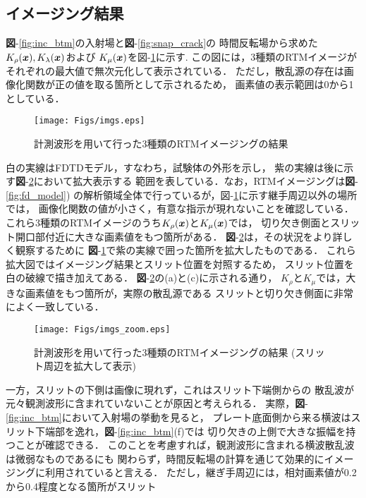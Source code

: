\subsection{イメージング結果}
{\bf 図}-\ref{fig:inc_btm}の入射場と{\bf 図}-\ref{fig:snap_crack}の
時間反転場から求めた$K_\rho(\boldsymbol{x}),K_{\lambda}(\boldsymbol{x})$および
$K_{\mu}(\boldsymbol{x})$を{図-}\ref{fig:imgs}に示す. 
この図には，3種類のRTMイメージがそれぞれの最大値で無次元化して表示されている．
ただし，散乱源の存在は画像化関数が正の値を取る箇所として示されるため，
画素値の表示範囲は0から1としている．
\begin{figure}[tbh]
\centering
	\texttt{[image: Figs/imgs.eps]}
	\caption{計測波形を用いて行った3種類のRTMイメージングの結果}
	\label{fig:imgs}
\end{figure}
白の実線はFDTDモデル，すなわち，試験体の外形を示し，
紫の実線は後に示す{\bf 図}-\ref{fig:imgs_zoom}において拡大表示する
範囲を表している．なお，RTMイメージングは{\bf 図}-\ref{fig:fd_model})
の解析領域全体で行っているが，{図-}\ref{fig:imgs}に示す継手周辺以外の場所では，
画像化関数の値が小さく，有意な指示が現れないことを確認している．
\\
\hspace{\parindent}
これら3種類のRTMイメージのうち$K_\rho(\boldsymbol{x})$と$K_{\mu}(\boldsymbol{x})$では，
切り欠き側面とスリット開口部付近に大きな画素値をもつ箇所がある．
{\bf 図}-\ref{fig:imgs_zoom}は，その状況をより詳しく観察するために
{\bf 図}-\ref{fig:imgs}で紫の実線で囲った箇所を拡大したものである．
これら拡大図ではイメージング結果とスリット位置を対照するため，
スリット位置を白の破線で描き加えてある．
{\bf 図}-\ref{fig:imgs_zoom}の(a)と(c)に示される通り，
$K_\rho$と$K_\mu$では，大きな画素値をもつ箇所が，実際の散乱源である
スリットと切り欠き側面に非常によく一致している．
\begin{figure}[tbh]
\centering
	\texttt{[image: Figs/imgs\_zoom.eps]}
	\caption{計測波形を用いて行った3種類のRTMイメージングの結果
	(スリット周辺を拡大して表示)}
	\label{fig:imgs_zoom}
\end{figure}
一方，スリットの下側は画像に現れず，これはスリット下端側からの
散乱波が元々観測波形に含まれていないことが原因と考えられる．
実際，{\bf 図}-\ref{fig:inc_btm}において入射場の挙動を見ると，
プレート底面側から来る横波はスリット下端部を逸れ，{\bf 図}-\ref{fig:inc_btm}(f)では
切り欠きの上側で大きな振幅を持つことが確認できる．
このことを考慮すれば，観測波形に含まれる横波散乱波は微弱なものであるにも
関わらず，時間反転場の計算を通じて効果的にイメージングに利用されていると言える．
ただし，継ぎ手周辺には，相対画素値が0.2から0.4程度となる箇所がスリット
